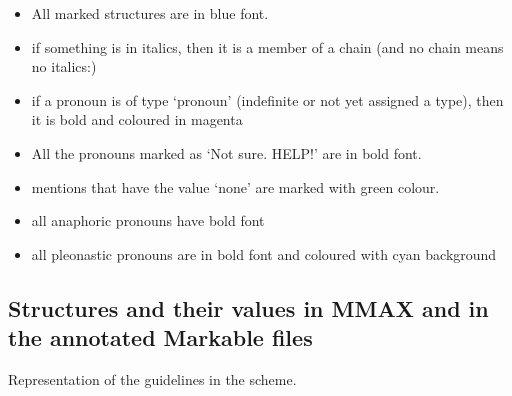 \documentclass[a4paper]{article}
\begin{document}
\begin{itemize}
\item All marked structures are in blue font. %
\item if something is in italics, then it is a member of a chain (and no chain means no italics:)
\item if a pronoun is of type `pronoun' (indefinite or not yet assigned a type), then it is bold and coloured in magenta %
\item All the pronouns marked as `Not sure. HELP!' are in bold font. %
\item mentions that have the value `none' are marked with green colour. %
\item all anaphoric pronouns have bold font %
\item all pleonastic pronouns are in bold font and coloured with cyan background %
\end{itemize}

\subsection{Structures and their values in MMAX and in the annotated Markable files}
Representation of the guidelines in the scheme.
\end{document}
